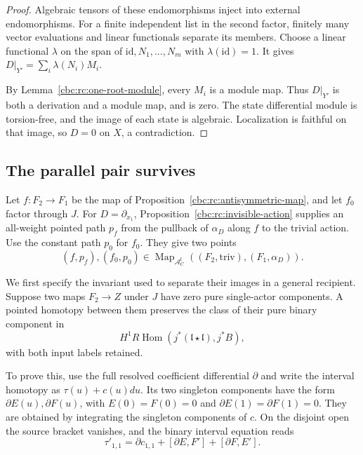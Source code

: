 \begin{proof}
Algebraic tensors of these endomorphisms inject
into external endomorphisms. For a finite
independent list in the second factor,
finitely many vector evaluations and linear
functionals separate its members.
Choose a linear functional $\lambda$ on the
span of $\mathrm{id},N_1,\ldots,N_m$ with
$\lambda(\mathrm{id})=1$. It gives
$D|_{Y'}=\sum_i\lambda(N_i)M_i$.

By Lemma~\ref{cbc:rc:one-root-module}, every
$M_i$ is a module map. Thus $D|_{Y'}$ is both
a derivation and a module map, and is zero.
The state differential module is torsion-free,
and the image of each state is algebraic.
Localization is faithful on that image, so
$D=0$ on $X$, a contradiction.
\end{proof}

\subsection{The parallel pair survives}

Let $f:F_2\to F_1$ be the map of
Proposition~\ref{cbc:rc:antisymmetric-map}, and
let $f_0$ factor through $J$.
For $D=\partial_{x_1}$,
Proposition~\ref{cbc:rc:invisible-action} supplies
an all-weight pointed path $p_f$ from the
pullback of $\alpha_D$ along $f$ to the
trivial action. Use the constant path $p_0$
for $f_0$. They give two points
\begin{equation}\label{cbc:rc:pointed-pair}
 (f,p_f),(f_0,p_0)\in
 \operatorname{Map}_{\mathscr A_C^{\mathrm f}}
 ((F_2,\mathrm{triv}),(F_1,\alpha_D)).
\end{equation}

We first specify the invariant used to separate
their images in a general recipient. Suppose two maps $F_2\to Z$ under $J$ have zero pure
single-actor components. A pointed homotopy between them preserves
the class of their pure binary component in
\begin{equation}\label{cbc:rc:binary-obstruction}
 H^1R\operatorname{Hom}
 (j^*(\mathfrak l\star\mathfrak l),j^*B),
\end{equation}
with both input labels retained.

To prove this,
use the full resolved coefficient differential
$\partial$ and write the interval homotopy
as $\tau(u)+c(u)du$.
Its two singleton components have the form
$\partial E(u),\partial F(u)$, with
$E(0)=F(0)=0$ and
$\partial E(1)=\partial F(1)=0$.
They are obtained by integrating the singleton
components of $c$. On the disjoint open the
source bracket vanishes, and the binary
interval equation reads
\[
 \tau'_{1,1}=\partial c_{1,1}
       +[\partial E,F']+[\partial F,E'].
\]

